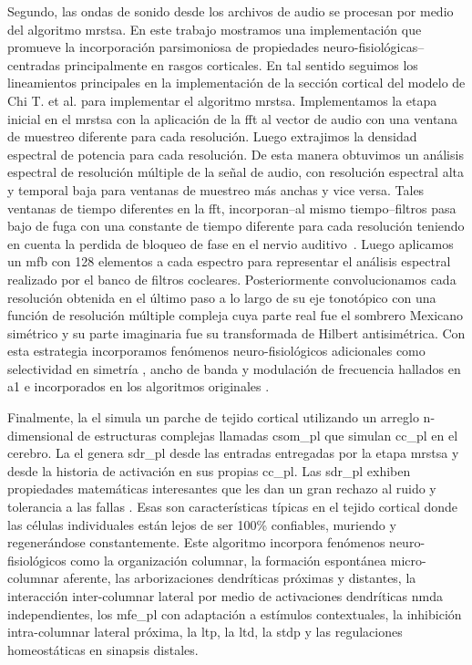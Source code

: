 {Segundo, las ondas de sonido desde los archivos de audio se procesan por medio del algoritmo \gls{mrstsa}.
En este trabajo mostramos una implementación que promueve la incorporación parsimoniosa de propiedades neuro-fisiológicas--centradas principalmente en rasgos corticales.
En tal sentido seguimos los lineamientos principales en la implementación de la sección cortical del modelo de Chi T. et al. \cite{chi_2005} para implementar el algoritmo \gls{mrstsa}.
Implementamos la etapa inicial en el \gls{mrstsa} con la aplicación de la \gls{fft} al vector de audio con una ventana de muestreo diferente para cada resolución.
Luego extrajimos la densidad espectral de potencia para cada resolución.
De esta manera obtuvimos un análisis espectral de resolución múltiple de la señal de audio, con resolución espectral alta y temporal baja para ventanas de muestreo más anchas y vice versa.
Tales ventanas de tiempo diferentes en la \gls{fft}, incorporan--al mismo tiempo--filtros pasa bajo de fuga con una constante de tiempo diferente para cada resolución teniendo en cuenta la perdida de bloqueo de fase en el nervio auditivo~\cite{chi_2005}.
Luego aplicamos un \gls{mfb} con 128 elementos a cada espectro para representar el análisis espectral realizado por el banco de filtros cocleares.
Posteriormente convolucionamos cada resolución obtenida en el último paso a lo largo de su eje tonotópico con una función de resolución múltiple compleja cuya parte real fue el sombrero Mexicano simétrico y su parte imaginaria fue su transformada de Hilbert antisimétrica.
Con esta estrategia incorporamos fenómenos neuro-fisiológicos adicionales como selectividad en simetría \cite{shamma_1993}, ancho de banda \cite{schreiner_1990} y modulación de frecuencia \cite{shamma_1993,heil_1992,mendelson_1985} hallados en \gls{a1} e incorporados en los algoritmos originales \cite{wang_1995}.

Finalmente, la \gls{el} simula un parche de tejido cortical utilizando un arreglo n-dimensional de estructuras complejas llamadas \gls{csom_pl} que simulan \gls{cc_pl} en el cerebro.
La \gls{el} genera \gls{sdr_pl} \cite{ahmad_2016} desde las entradas entregadas por la etapa \gls{mrstsa} y desde la historia de activación en sus propias \gls{cc_pl}.
Las \gls{sdr_pl} exhiben propiedades matemáticas interesantes que les dan un gran rechazo al ruido y tolerancia a las fallas \cite{DBLP:journals/corr/AhmadH15}.
Esas son características típicas en el tejido cortical donde las células individuales están lejos de ser 100\% confiables, muriendo y regenerándose constantemente.
Este algoritmo incorpora fenómenos neuro-fisiológicos como la organización columnar, la formación espontánea micro-columnar aferente, las arborizaciones dendríticas próximas y distantes, la interacción inter-columnar lateral por medio de activaciones dendríticas \gls{nmda} independientes, los \gls{mfe_pl} con adaptación a estímulos contextuales, la inhibición intra-columnar lateral próxima, la \gls{ltp}, la \gls{ltd}, la \gls{stdp} y las regulaciones homeostáticas en sinapsis distales.

}

